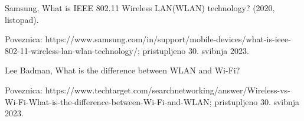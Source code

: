 
\begin{thebibliography}{9}
    Samsung, What is IEEE 802.11 Wireless LAN(WLAN) technology?
    (2020, listopad).

    Poveznica: https://www.samsung.com/in/support/mobile-devices/what-is-ieee-802-11-wireless-lan-wlan-technology/;
    pristupljeno 30. svibnja 2023.

    Lee Badman, What is the difference between WLAN and Wi-Fi?

    Poveznica: https://www.techtarget.com/searchnetworking/answer/Wireless-vs-Wi-Fi-What-is-the-difference-between-Wi-Fi-and-WLAN;
    pristupljeno 30. svibnja 2023.
\end{thebibliography}